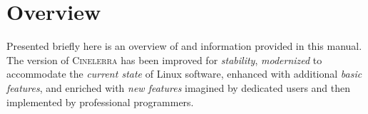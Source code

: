 
\section*{\CGG{} Overview}%
\label{sec:cinelerra_overview}

Presented briefly here is an overview of \CGGI{} and information
provided in this manual. The \GG{} version of \textsc{Cinelerra} has
been improved for \emph{stability}, \emph{modernized} to accommodate
the \emph{current state} of Linux software, enhanced with additional
\emph{basic features}, and enriched with \emph{new features}
imagined by dedicated users and then implemented by professional
programmers.

